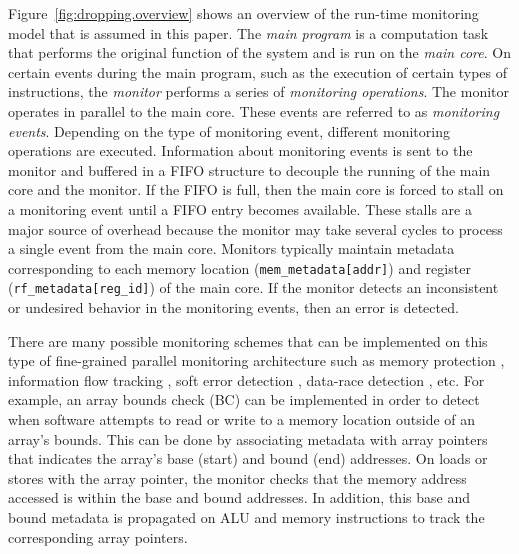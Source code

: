 Figure~\ref{fig:dropping.overview} shows an overview of the run-time monitoring
model that is assumed in this paper.  The \emph{main program} is a computation
task that performs the original function of the system and is run on the
\emph{main core}.  On certain events during the main program, such as the
execution of certain types of instructions, the \emph{monitor} performs a
series of \emph{monitoring operations}. The monitor operates in parallel to the
main core. These events are referred to as \emph{monitoring events}. Depending
on the type of monitoring event, different monitoring operations are
executed. Information about monitoring events is sent to the monitor and
buffered in a FIFO structure to decouple the
running of the main core and the monitor. If the FIFO is full, then the main
core is forced to stall on a monitoring event until a FIFO entry becomes
available. These stalls are a major source of
overhead because the monitor may take several cycles to process a single event
from the main core. 
Monitors typically maintain metadata corresponding to each memory location
({\tt mem\_metadata[addr]}) and register ({\tt rf\_metadata[reg\_id]}) of the
main core.
If the monitor
detects an inconsistent or undesired behavior in the monitoring events, then
an error is detected. 

There are many possible monitoring schemes that can be implemented on this type
of fine-grained parallel monitoring architecture such as memory protection
\cite{mondrian-asplos02}, information flow tracking \cite{dift-asplos04,
testudo-micro08}, soft error detection \cite{argus-micro07}, data-race
detection \cite{cord-hpca06}, etc.  For example, an array bounds check (BC)
\cite{hardbound-asplos08} can be implemented in order to detect
when software attempts to read or write to a memory location outside of an
array's bounds. This can be done by associating metadata with array pointers that 
indicates the array's base (start) and bound (end) addresses. On loads or stores with the
array
pointer, the monitor checks that the memory address accessed is within the base and
bound addresses. In addition, this base and bound metadata
is propagated on ALU and memory instructions to track the corresponding array pointers.

